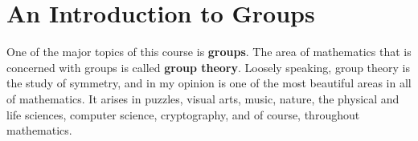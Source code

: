 \chapter{An Introduction to Groups}
\label{chapter:intro_groups}


One of the major topics of this course is \textbf{groups}.  The area of mathematics that is concerned with groups is called \textbf{group theory}. Loosely speaking, group theory is the study of symmetry, and in my opinion is one of the most beautiful areas in all of mathematics. It arises in puzzles, visual arts, music, nature, the physical and life sciences, computer science, cryptography, and of course, throughout mathematics.


